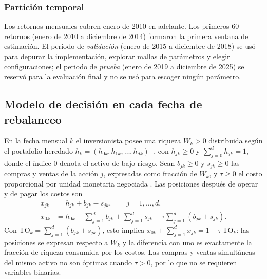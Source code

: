 \subsubsection{Partición temporal}

Los retornos mensuales cubren enero de 2010 en adelante. Los primeros 60 retornos (enero de 2010 a diciembre de 2014) formaron la primera ventana de estimación. El periodo de \emph{validación} (enero de 2015 a diciembre de 2018) se usó para depurar la implementación, explorar mallas de parámetros y elegir configuraciones; el periodo de \emph{prueba} (enero de 2019 a diciembre de 2025) se reservó para la evaluación final y no se usó para escoger ningún parámetro.

\subsection{Modelo de decisión en cada fecha de rebalanceo}\label{sec:decision}

En la fecha mensual $k$ el inversionista posee una riqueza $W_k>0$ distribuida según el portafolio heredado $h_k=(h_{0k},h_{1k},\dots,h_{dk})^\top$, con $h_{jk}\ge 0$ y $\sum_{j=0}^d h_{jk}=1$, donde el índice $0$ denota el activo de bajo riesgo. Sean $b_{jk}\ge0$ y $s_{jk}\ge0$ las compras y ventas de la acción $j$, expresadas como fracción de $W_k$, y $\tau\ge0$ el costo proporcional por unidad monetaria negociada \citep{hsiehyu2024}. Las posiciones después de operar y de pagar los costos son
\begin{align}
x_{jk}&=h_{jk}+b_{jk}-s_{jk}, \qquad j=1,\dots,d, \label{eq:bal_j}\\
x_{0k}&=h_{0k}-\sum_{j=1}^{d}b_{jk}+\sum_{j=1}^{d}s_{jk}-\tau\sum_{j=1}^{d}(b_{jk}+s_{jk}). \label{eq:bal_0}
\end{align}
Con $\mathrm{TO}_k=\sum_{j=1}^d(b_{jk}+s_{jk})$, esto implica $x_{0k}+\sum_{j=1}^d x_{jk}=1-\tau\,\mathrm{TO}_k$: las posiciones se expresan respecto a $W_k$ y la diferencia con uno es exactamente la fracción de riqueza consumida por los costos. Las compras y ventas simultáneas del mismo activo no son óptimas cuando $\tau>0$, por lo que no se requieren variables binarias.

